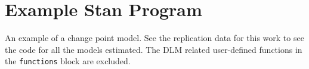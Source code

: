 \section*{Example Stan Program}
\label{dlm:sec:example-stan-program}

An example of a change point model.
See the replication data for this work to see the code for all the \Stan{} models estimated.
The DLM related user-defined functions in the \texttt{functions} block are excluded.

\inputminted[firstline=5,style=bw]{stan}{../dlm-shrinkage/stan/changepoint_horseshoe.stan.mustache}  


